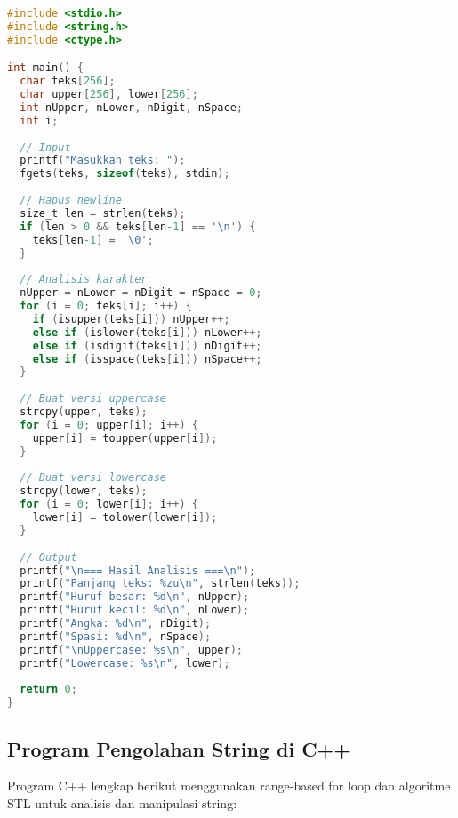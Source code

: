 \documentclass[../main.tex]{subfiles}
\begin{document}
\begin{lstlisting}[language=C, caption={Program manipulasi string di C}]
#include <stdio.h>
#include <string.h>
#include <ctype.h>

int main() {
  char teks[256];
  char upper[256], lower[256];
  int nUpper, nLower, nDigit, nSpace;
  int i;
  
  // Input
  printf("Masukkan teks: ");
  fgets(teks, sizeof(teks), stdin);
  
  // Hapus newline
  size_t len = strlen(teks);
  if (len > 0 && teks[len-1] == '\n') {
    teks[len-1] = '\0';
  }
  
  // Analisis karakter
  nUpper = nLower = nDigit = nSpace = 0;
  for (i = 0; teks[i]; i++) {
    if (isupper(teks[i])) nUpper++;
    else if (islower(teks[i])) nLower++;
    else if (isdigit(teks[i])) nDigit++;
    else if (isspace(teks[i])) nSpace++;
  }
  
  // Buat versi uppercase
  strcpy(upper, teks);
  for (i = 0; upper[i]; i++) {
    upper[i] = toupper(upper[i]);
  }
  
  // Buat versi lowercase
  strcpy(lower, teks);
  for (i = 0; lower[i]; i++) {
    lower[i] = tolower(lower[i]);
  }
  
  // Output
  printf("\n=== Hasil Analisis ===\n");
  printf("Panjang teks: %zu\n", strlen(teks));
  printf("Huruf besar: %d\n", nUpper);
  printf("Huruf kecil: %d\n", nLower);
  printf("Angka: %d\n", nDigit);
  printf("Spasi: %d\n", nSpace);
  printf("\nUppercase: %s\n", upper);
  printf("Lowercase: %s\n", lower);
  
  return 0;
}
\end{lstlisting}

\subsection{Program Pengolahan String di C++}

Program C++ lengkap berikut menggunakan range-based for loop dan algoritme STL untuk analisis dan manipulasi string:
\end{document}
